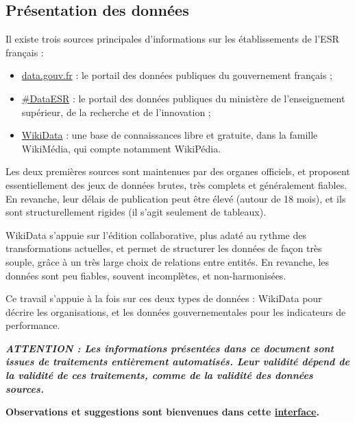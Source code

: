 \documentclass[11pt,french,landscape]{article}
\providecommand{\tightlist}{%
  \setlength{\itemsep}{0pt}\setlength{\parskip}{0pt}}
\begin{document}
\newpage
\begin{multicols}{2}
\tableofcontents
\newpage
\part{Présentation des données}

Il existe trois sources principales d'informations sur les
établissements de l'ESR français :

\begin{itemize}
\tightlist
\item
  \href{https://www.data.gouv.fr/fr/}{data.gouv.fr} : le portail des
  données publiques du gouvernement français ;
\item
  \href{https://data.esr.gouv.fr/FR/}{\#DataESR} : le portail des
  données publiques du ministère de l'enseignement supérieur, de la
  recherche et de l'innovation ;
\item
  \href{https://www.wikidata.org/wiki/Wikidata:Main_Page}{WikiData} :
  une base de connaissances libre et gratuite, dans la famille
  WikiMédia, qui compte notamment WikiPédia.
\end{itemize}

Les deux premières sources sont maintenues par des organes officiels, et
proposent essentiellement des jeux de données brutes, très complets et
généralement fiables. En revanche, leur délais de publication peut être
élevé (autour de 18 mois), et ils sont structurellement rigides (il
s'agit seulement de tableaux).

WikiData s'appuie sur l'édition collaborative, plus adaté au rythme des
transformations actuelles, et permet de structurer les données de façon
très souple, grâce à un très large choix de relations entre entités. En
revanche, les données sont peu fiables, souvent incomplètes, et
non-harmonisées.

Ce travail s'appuie à la fois sur ces deux types de données : WikiData
pour décrire les organisations, et les données gouvernementales pour les
indicateurs de performance.

\textbf{\emph{ATTENTION : Les informations présentées dans ce document
sont issues de traitements entièrement automatisés. Leur validité dépend
de la validité de ces traitements, comme de la validité des données
sources.}}

\textbf{Observations et suggestions sont bienvenues dans cette
\href{https://github.com/cpesr/tdbESR-rapport/issues}{interface}.}

\hypertarget{description-des-organisations}{%
}
\end{multicols}
\end{document}
